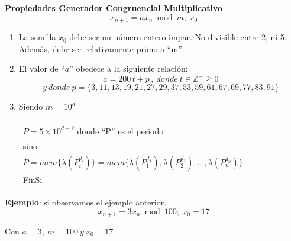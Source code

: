 \documentclass[11pt,letterpaper]{report}
\newenvironment{algoritmo}
  {\begin{center}\begin{tabular}{|p{0.85\textwidth}|}\hline\vspace{-0.2cm}\begin{tabbing}\hspace{0.6cm}\=\hspace{0.6cm}\=\hspace{0.6cm}\=\hspace{0.6cm}\=\hspace{0.6cm}\=\kill}
  {\end{tabbing}\vspace{-0.4cm}\\\hline\end{tabular}\end{center}}
\begin{document}
\textbf{Propiedades Generador Congruencial Multiplicativo}
\[
x_{n+1} = a x_n \bmod m;\ x_0
\]
\begin{enumerate}[label=\roman*)]
\item La semilla $x_0$ debe ser un número entero impar. No divisible entre 2, ni 5. Además, debe ser relativamente primo a ``m''.
\item El valor de ``$a$'' obedece a la siguiente relación:
\[
a = 200\,t \pm p\,,\ donde\ t \in \mathbb{Z}^+ \geqq 0
\]
\[
y\ donde\ p = \{3,11,13,19,21,27,29,37,53,59,61,67,69,77,83,91\}
\]
\item Siendo $m = 10^d$

\begin{algoritmo}
\>Si $d \geq 5$ entonces\\
\>\>$P = 5 \times 10^{d-2}$ donde ``P'' es el periodo\\
\>sino\\
\>\>$P = mcm\{\lambda(P_i^{d_i})\} = mcm\{\lambda(P_1^{d_1}), \lambda(P_2^{d_2}), \ldots, \lambda(P_n^{d_n})\}$\\
\>FinSi
\end{algoritmo}
\end{enumerate}

\begin{center}
\end{center}

\textbf{Ejemplo}: si observamos el ejemplo anterior.
\[
x_{n+1} = 3x_n \bmod 100;\ x_0 = 17
\]
\begin{center}
Con $a = 3,\ m = 100\ y\ x_0 = 17$
\end{center}
\end{document}
